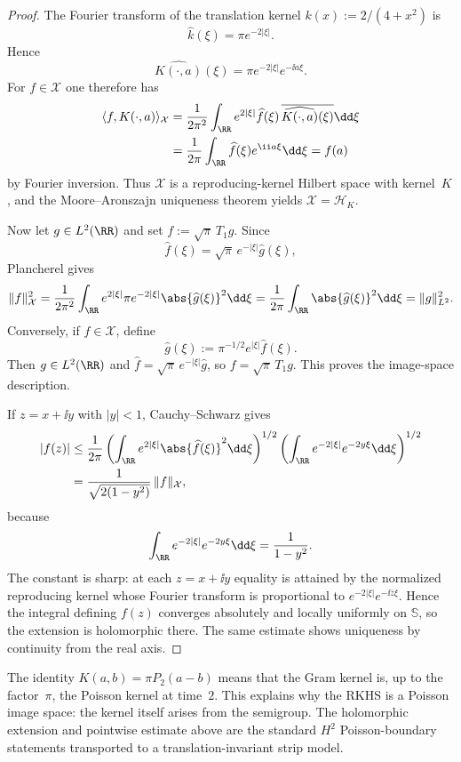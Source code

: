 \begin{proof}
The Fourier transform of the translation kernel $k(x):=2/(4+x^2)$ is
\[
\widehat k(\xi)=\pi e^{-2|\xi|}.
\]
Hence
\[
\widehat{K(\cdot,a)}(\xi)=\pi e^{-2|\xi|}e^{-\ii a\xi}.
\]
For $f\in\mathcal X$ one therefore has
\begin{align*}
\langle f,K(\cdot,a)\rangle_{\mathcal X}
&=
\frac{1}{2\pi^2}\int_{\RR}
e^{2|\xi|}\widehat f(\xi)\,
\overline{\widehat{K(\cdot,a)}(\xi)}\dd\xi \\
&=
\frac{1}{2\pi}\int_{\RR}\widehat f(\xi)e^{\ii a\xi}\dd\xi
=f(a)
\end{align*}
by Fourier inversion.  Thus $\mathcal X$ is a reproducing-kernel Hilbert
space with kernel~$K$, and the Moore--Aronszajn uniqueness theorem yields
$\mathcal X=\mathcal H_K$.

Now let $g\in L^2(\RR)$ and set $f:=\sqrt{\pi}\,T_1 g$.  Since
\[
\widehat f(\xi)=\sqrt{\pi}\,e^{-|\xi|}\widehat g(\xi),
\]
Plancherel gives
\[
\|f\|_{\mathcal X}^2
=\frac{1}{2\pi^2}\int_{\RR}e^{2|\xi|}\pi e^{-2|\xi|}
\abs{\widehat g(\xi)}^2\dd\xi
=\frac{1}{2\pi}\int_{\RR}\abs{\widehat g(\xi)}^2\dd\xi
=\|g\|_{L^2}^2.
\]
Conversely, if $f\in\mathcal X$, define
\[
\widehat g(\xi):=\pi^{-1/2}e^{|\xi|}\widehat f(\xi).
\]
Then $g\in L^2(\RR)$ and
$\widehat f=\sqrt{\pi}\,e^{-|\xi|}\widehat g$, so
$f=\sqrt{\pi}\,T_1 g$.  This proves the image-space description.

If $z=x+\ii y$ with $|y|<1$, Cauchy--Schwarz gives
\begin{align*}
|f(z)|
&\le \frac{1}{2\pi}
\left(\int_{\RR}e^{2|\xi|}\abs{\widehat f(\xi)}^2\dd\xi\right)^{1/2}
\left(\int_{\RR}e^{-2|\xi|}e^{-2y\xi}\dd\xi\right)^{1/2} \\
&=
\frac{1}{\sqrt{2(1-y^2)}}\,\|f\|_{\mathcal X},
\end{align*}
because
\[
\int_{\RR}e^{-2|\xi|}e^{-2y\xi}\dd\xi=\frac{1}{1-y^2}.
\]
The constant is sharp: at each $z=x+\ii y$ equality is attained by the
normalized reproducing kernel whose Fourier transform is proportional to
$e^{-2|\xi|}e^{-\ii\overline z\xi}$.
Hence the integral defining $f(z)$ converges absolutely and locally
uniformly on $\mathbb S$, so the extension is holomorphic there.  The same
estimate shows uniqueness by continuity from the real axis.
\end{proof}

\begin{remark}\label{rem:poisson-image-framework}
The identity $K(a,b) = \pi P_2(a-b)$ means that the Gram kernel is,
up to the factor~$\pi$, the Poisson kernel at time~$2$.  This explains
why the RKHS is a Poisson image space: the kernel itself arises from the
semigroup.  The holomorphic extension and pointwise estimate above are
the standard $H^2$ Poisson-boundary statements transported to a
translation-invariant strip model.
\end{remark}

